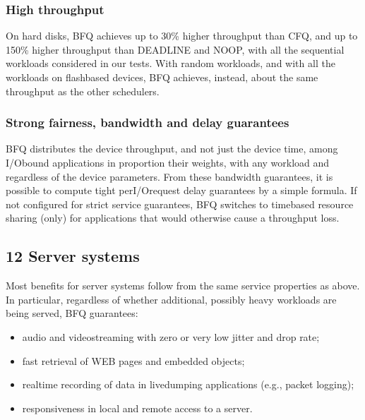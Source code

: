 \documentclass[a4paper,11pt,english]{sphinxmanual}
\begin{document}
\subsubsection{High throughput}
\label{\detokenize{bfq-iosched:high-throughput}}
On hard disks, BFQ achieves up to 30\% higher throughput than CFQ, and
up to 150\% higher throughput than DEADLINE and NOOP, with all the
sequential workloads considered in our tests. With random workloads,
and with all the workloads on flash\sphinxhyphen{}based devices, BFQ achieves,
instead, about the same throughput as the other schedulers.


\subsubsection{Strong fairness, bandwidth and delay guarantees}
\label{\detokenize{bfq-iosched:strong-fairness-bandwidth-and-delay-guarantees}}
BFQ distributes the device throughput, and not just the device time,
among I/O\sphinxhyphen{}bound applications in proportion their weights, with any
workload and regardless of the device parameters. From these bandwidth
guarantees, it is possible to compute tight per\sphinxhyphen{}I/O\sphinxhyphen{}request delay
guarantees by a simple formula. If not configured for strict service
guarantees, BFQ switches to time\sphinxhyphen{}based resource sharing (only) for
applications that would otherwise cause a throughput loss.


\subsection{1\sphinxhyphen{}2 Server systems}
\label{\detokenize{bfq-iosched:server-systems}}
Most benefits for server systems follow from the same service
properties as above. In particular, regardless of whether additional,
possibly heavy workloads are being served, BFQ guarantees:
\begin{itemize}
\item {} 
audio and video\sphinxhyphen{}streaming with zero or very low jitter and drop
rate;

\item {} 
fast retrieval of WEB pages and embedded objects;

\item {} 
real\sphinxhyphen{}time recording of data in live\sphinxhyphen{}dumping applications (e.g.,
packet logging);

\item {} 
responsiveness in local and remote access to a server.

\end{itemize}
\end{document}
